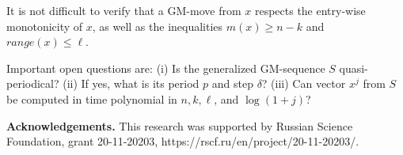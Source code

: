 \documentclass[10pt]{article}
\theoremstyle{definition}
\begin{document}
It is not difficult to verify that a GM-move 
from $x$ respects 
the entry-wise monotonicity of $x$, 
as well as the inequalities 
$m(x) \geq n-k$ and $range(x) \leq \ell$. 

Important open questions are:  
\newline
(i) Is the generalized GM-sequence $S$ quasi-periodical?  
\newline
(ii) If yes, what is its period $p$ and step $\delta$? 
\newline
(iii) Can vector $x^j$ from $S$  be computed in time 
polynomial in $n, k, \ell$, and  $\log(1+j)$? 

 
 \bigskip 

\noindent 
{\bf Acknowledgements.}
This research was supported by Russian Science Foundation, 
grant  20-11-20203, https://rscf.ru/en/project/20-11-20203/.
\end{document}
